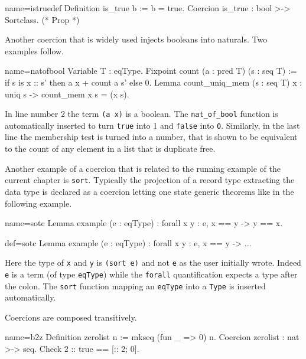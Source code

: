 \begin{coq}{name=istruedef}{}
Definition is_true b := b = true.
Coercion is_true : bool >-> Sortclass. (* Prop *)
\end{coq}

Another coercion that is widely used injects booleans into naturals.
Two examples follow.

\begin{coq}{name=natofbool}{}
Variable T : eqType.
Fixpoint count (a : pred T) (s : seq T) :=
  if s is x :: s' then a x + count a s' else 0.
Lemma count_uniq_mem (s : seq T) x :
  uniq s -> count_mem x s = (x \in s).
\end{coq}

In line number 2 the term \lstinline/(a x)/ is a boolean.  The
\lstinline/nat_of_bool/ function is automatically inserted to turn
\lstinline/true/ into 1 and \lstinline/false/ into \lstinline/0/.
Similarly, in the last line the membership test is turned into
a number, that is shown to be equivalent to the count of any
element in a list that is duplicate free.

Another example of a coercion that is related to the running example
of the current chapter is \lstinline/sort/.  Typically the projection
of a record type extracting the data type is declared as a coercion
letting one state generic theorems like in the following example.

\begin{coqdef}{name=sotc}
Lemma example (e : eqType) : forall x y : e, x == y -> y == x.
\end{coqdef}
\begin{coq}{def=sotc}{}
Lemma example (e : eqType) : forall x y : e, x == y -> ...
\end{coq}

Here the type of \lstinline/x/ and \lstinline/y/ is
\lstinline/(sort e)/ and not \lstinline/e/ as the user initially wrote.
Indeed \lstinline/e/ is a term (of type \lstinline/eqType/) while
the \lstinline/forall/ quantification expects a type after the
colon.  The \lstinline/sort/ function mapping an \lstinline/eqType/
into a \lstinline/Type/ is inserted automatically.

Coercions are composed transitively.

\begin{coq}{name=b2z}{}
Definition zerolist n := mkseq (fun _ => 0) n.
Coercion zerolist : nat >-> seq.
Check 2 :: true == [:: 2; 0].
\end{coq}

